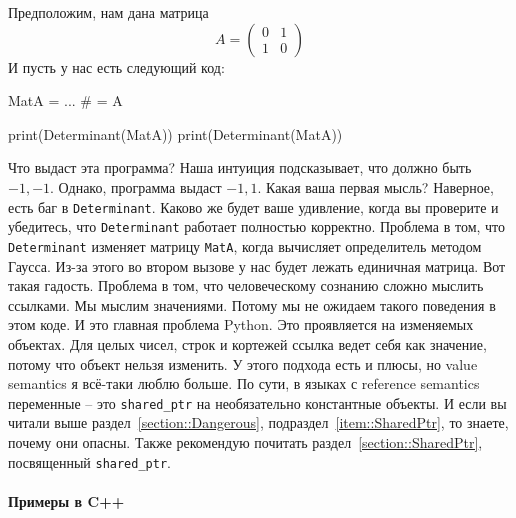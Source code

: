 Предположим, нам дана матрица
\[
A = 
\begin{pmatrix}
{0}&{1}\\
{1}&{0}
\end{pmatrix}
\]
И пусть у нас есть следующий код:
\begin{pythoncode}
MatA = ...
# = A

print(Determinant(MatA))
print(Determinant(MatA))
\end{pythoncode}
Что выдаст эта программа?
Наша интуиция подсказывает, что должно быть $-1, -1$.
Однако, программа выдаст $-1, 1$.
Какая ваша первая мысль?
Наверное, есть баг в \verb"Determinant".
Каково же будет ваше удивление, когда вы проверите и убедитесь, что \verb"Determinant" работает полностью корректно.
Проблема в том, что \verb"Determinant" изменяет матрицу \verb"MatA", когда вычисляет определитель методом Гаусса.
Из-за этого во втором вызове у нас будет лежать единичная матрица.
Вот такая гадость.
Проблема в том, что человеческому сознанию сложно мыслить ссылками.
Мы мыслим значениями.
Потому мы не ожидаем такого поведения в этом коде.
И это главная проблема Python.
Это проявляется на изменяемых объектах. Для целых чисел, строк и кортежей ссылка ведет себя как значение, потому что объект нельзя изменить.
У этого подхода есть и плюсы, но value semantics я всё-таки люблю больше.
По сути, в языках с reference semantics переменные -- это \verb"shared_ptr" на необязательно константные объекты.
И если вы читали выше раздел~\ref{section::Dangerous}, подраздел~\ref{item::SharedPtr}, то знаете, почему они опасны.
Также рекомендую почитать раздел~\ref{section::SharedPtr}, посвященный \verb"shared_ptr".

\paragraph{Примеры в C++}

